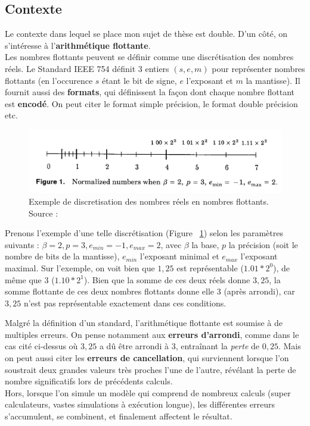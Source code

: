 \documentclass[a4paper,11pt]{article}
\begin{document}
\subsection{Contexte}
Le contexte dans lequel se place mon sujet de thèse est double.
D’un côté, on s’intéresse à l’\textbf{arithmétique flottante}. \\
Les nombres flottants peuvent se définir comme une discrétisation des nombres réels. 
Le Standard IEEE 754\cite{zuras2008ieee} définit 3 entiers $(s,e,m)$ pour représenter nombres flottants (en l'occurence $s$ étant le bit de signe, $e$ l'exposant et $m$ la mantisse). Il fournit aussi des \textbf{formats}, qui définissent la façon dont chaque nombre flottant est \textbf{encodé}. On peut citer le format simple précision, le format double précision etc. \\
\begin{figure}[b]
  \begin{center}
    \includegraphics[width=12cm]{Floating_point_numbers_discretization}
    \caption{Exemple de discretisation des nombres réels en nombres flottants. Source : \cite{goldberg1991every}}
    \label{discretization}
  \end{center}
\end{figure}
Prenons l'exemple d'une telle discrétisation (Figure ~\ref{discretization}) selon les paramètres suivants : $\beta=2, p=3, e_{min}=-1,e_{max}=2$, avec $\beta$ la base, $p$ la précision (soit le nombre de bits de la mantisse), $e_{min}$ l'exposant minimal et $e_{max}$ l'exposant maximal.
Sur l'exemple, on voit bien que $1,25$ est représentable ($1.01*2^{0}$), de même que $3$ ($1.10*2^{1}$). Bien que la somme de ces deux réels donne $3,25$, la somme flottante de ces deux nombres flottants donne elle $3$ (après arrondi), car $3,25$ n'est pas représentable exactement dans ces conditions.

Malgré la définition d'un standard, l'arithmétique flottante est soumise à de multiples erreurs. On pense notamment aux \textbf{erreurs d'arrondi}, comme dans le cas cité ci-dessus où $3,25$ a dû être arrondi à $3$, entraînant la \textit{perte} de $0,25$. Mais on peut aussi citer les \textbf{erreurs de cancellation}, qui surviennent lorsque l'on soustrait deux grandes valeurs très proches l'une de l'autre, révélant la perte de nombre significatifs lors de précédents calculs. \\ %
Hors, lorsque l’on simule un modèle qui comprend de nombreux calculs (super calculateurs, vastes simulations à exécution longue), les différentes erreurs s’accumulent, se combinent, et finalement affectent le résultat.
\end{document}
